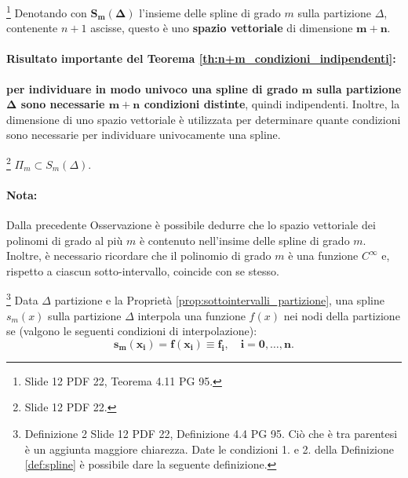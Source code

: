 \begin{theorem}\label{th:n+m_condizioni_indipendenti}
    \footnote{Slide 12 PDF 22, Teorema 4.11 PG 95.} Denotando con $\boldsymbol{S_m(\Delta)}$ l'insieme delle spline di grado $m$ sulla partizione $\Delta$, contenente $n+1$ ascisse, questo è uno \textbf{spazio vettoriale} di dimensione $\boldsymbol{m+n}$.
\end{theorem}

\paragraph{Risultato importante del Teorema \ref{th:n+m_condizioni_indipendenti}:} \textbf{per individuare in modo univoco una spline di grado $\boldsymbol m$ sulla partizione $\boldsymbol{\Delta}$ sono necessarie $\boldsymbol{m+n}$ condizioni distinte}, quindi indipendenti. Inoltre, la dimensione di uno spazio vettoriale è utilizzata per determinare quante condizioni sono necessarie per individuare univocamente una spline.

\begin{remark}
    \footnote{Slide 12 PDF 22.} $\Pi_m\subset S_m(\Delta).$
\end{remark}

\paragraph{Nota:} Dalla precedente Osservazione è possibile dedurre che lo spazio vettoriale dei polinomi di grado al più $m$ è contenuto nell'insime delle spline di grado $m$. Inoltre, è necessario ricordare che il polinomio di grado $m$ è una funzione $C^\infty$ e, rispetto a ciascun sotto-intervallo, coincide con se stesso.

\begin{definition}\label{def:spline_interpolante}\footnote{Definizione 2 Slide 12 PDF 22, Definizione 4.4 PG 95. Ciò che è tra parentesi è un aggiunta maggiore chiarezza. Date le condizioni 1. e 2. della Definizione \ref{def:spline} è possibile dare la seguente definizione.}
    Data $\Delta$ partizione e la Proprietà \ref{prop:sottointervalli_partizione}, una spline $s_m(x)$ sulla partizione $\Delta$ interpola una funzione $f(x)$ nei nodi della partizione se (valgono le seguenti condizioni di interpolazione): 
    \begin{equation}\label{eq:condizioni_interpolazione_spline}
        \boldsymbol{s_m(x_i)=f(x_i)\equiv f_i,\quad i=0,\hdots,n.}
    \end{equation}
\end{definition}

